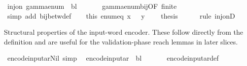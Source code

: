 \begin{isabellebody}
\ {\isachardoublequoteopen}inj{\isacharunderscore}{\kern0pt}on\ {\isacharparenleft}{\kern0pt}gamma{\isacharunderscore}{\kern0pt}enum\ {\isasymGamma}\ bl{\isacharparenright}{\kern0pt}\ {\isasymGamma}{\isachardoublequoteclose}\isanewline
\ \ \ \ \isamarkupfalse%
\ gamma{\isacharunderscore}{\kern0pt}enum{\isacharunderscore}{\kern0pt}bij{\isacharbrackleft}{\kern0pt}OF\ {\isacartoucheopen}finite\ {\isasymGamma}{\isacartoucheclose}{\isacharbrackright}{\kern0pt}\isanewline
\ \ \ \ \isamarkupfalse%
\ {\isacharparenleft}{\kern0pt}simp\ add{\isacharcolon}{\kern0pt}\ bij{\isacharunderscore}{\kern0pt}betw{\isacharunderscore}{\kern0pt}def{\isacharparenright}{\kern0pt}\isanewline
\ \ \isamarkupfalse%
\ this\ enum{\isacharunderscore}{\kern0pt}eq\ {\isacartoucheopen}x\ {\isasymin}\ {\isasymGamma}{\isacartoucheclose}\ {\isacartoucheopen}y\ {\isasymin}\ {\isasymGamma}{\isacartoucheclose}\ \isamarkupfalse%
\ {\isacharquery}{\kern0pt}thesis\isanewline
\ \ \ \ \isamarkupfalse%
\ {\isacharparenleft}{\kern0pt}rule\ inj{\isacharunderscore}{\kern0pt}onD{\isacharparenright}{\kern0pt}\isanewline
{}\isamarkupfalse%
%
\endisatagproof
{\isafoldproof}%
%
\isadelimproof
%
\endisadelimproof
%
\begin{isamarkuptext}%
Structural properties of the input-word encoder.  These
  follow directly from the  definition and are useful for the validation-phase
  reach lemmas in later slices.%
\end{isamarkuptext}\isamarkuptrue%
\isamarkupfalse%
\ encode{\isacharunderscore}{\kern0pt}input{\isacharunderscore}{\kern0pt}ar{\isacharunderscore}{\kern0pt}Nil\ {\isacharbrackleft}{\kern0pt}simp{\isacharbrackright}{\kern0pt}{\isacharcolon}{\kern0pt}\isanewline
\ \ {\isachardoublequoteopen}encode{\isacharunderscore}{\kern0pt}input{\isacharunderscore}{\kern0pt}ar\ {\isasymGamma}\ bl\ {\isacharbrackleft}{\kern0pt}{\isacharbrackright}{\kern0pt}\ {\isacharequal}{\kern0pt}\ {\isacharbrackleft}{\kern0pt}{\isacharbrackright}{\kern0pt}{\isachardoublequoteclose}\isanewline
%
\isadelimproof
\ \ %
\endisadelimproof
%
\isatagproof
{}\isamarkupfalse%
\ encode{\isacharunderscore}{\kern0pt}input{\isacharunderscore}{\kern0pt}ar{\isacharunderscore}{\kern0pt}def\ \isamarkupfalse%

\end{isabellebody}
